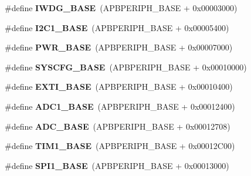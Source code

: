 \begin{DoxyCompactItemize}
\#define {\bfseries I\+W\+D\+G\+\_\+\+B\+A\+SE}~(A\+P\+B\+P\+E\+R\+I\+P\+H\+\_\+\+B\+A\+SE + 0x00003000)
\item 
\mbox{\label{group___peripheral__memory__map_gacd72dbffb1738ca87c838545c4eb85a3}} 
\#define {\bfseries I2\+C1\+\_\+\+B\+A\+SE}~(A\+P\+B\+P\+E\+R\+I\+P\+H\+\_\+\+B\+A\+SE + 0x00005400)
\item 
\mbox{\label{group___peripheral__memory__map_gac691ec23dace8b7a649a25acb110217a}} 
\#define {\bfseries P\+W\+R\+\_\+\+B\+A\+SE}~(A\+P\+B\+P\+E\+R\+I\+P\+H\+\_\+\+B\+A\+SE + 0x00007000)
\item 
\mbox{\label{group___peripheral__memory__map_ga62246020bf3b34b6a4d8d0e84ec79d3d}} 
\#define {\bfseries S\+Y\+S\+C\+F\+G\+\_\+\+B\+A\+SE}~(A\+P\+B\+P\+E\+R\+I\+P\+H\+\_\+\+B\+A\+SE + 0x00010000)
\item 
\mbox{\label{group___peripheral__memory__map_ga87371508b3bcdcd98cd1ec629be29061}} 
\#define {\bfseries E\+X\+T\+I\+\_\+\+B\+A\+SE}~(A\+P\+B\+P\+E\+R\+I\+P\+H\+\_\+\+B\+A\+SE + 0x00010400)
\item 
\mbox{\label{group___peripheral__memory__map_ga695c9a2f892363a1c942405c8d351b91}} 
\#define {\bfseries A\+D\+C1\+\_\+\+B\+A\+SE}~(A\+P\+B\+P\+E\+R\+I\+P\+H\+\_\+\+B\+A\+SE + 0x00012400)
\item 
\mbox{\label{group___peripheral__memory__map_gad06cb9e5985bd216a376f26f22303cd6}} 
\#define {\bfseries A\+D\+C\+\_\+\+B\+A\+SE}~(A\+P\+B\+P\+E\+R\+I\+P\+H\+\_\+\+B\+A\+SE + 0x00012708)
\item 
\mbox{\label{group___peripheral__memory__map_gaf8aa324ca5011b8173ab16585ed7324a}} 
\#define {\bfseries T\+I\+M1\+\_\+\+B\+A\+SE}~(A\+P\+B\+P\+E\+R\+I\+P\+H\+\_\+\+B\+A\+SE + 0x00012\+C00)
\item 
\mbox{\label{group___peripheral__memory__map_ga50cd8b47929f18b05efbd0f41253bf8d}} 
\#define {\bfseries S\+P\+I1\+\_\+\+B\+A\+SE}~(A\+P\+B\+P\+E\+R\+I\+P\+H\+\_\+\+B\+A\+SE + 0x00013000)

\end{DoxyCompactItemize}
